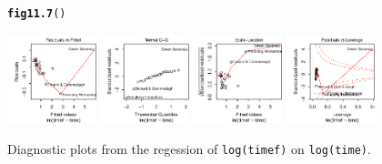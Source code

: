 \documentclass[12pt, a4paper,  BCOR=8.25mm, DIV=15]{scrartcl}\usepackage[]{graphicx}\usepackage[]{color}
\makeatletter
\newcommand{\hlstd}[1]{\textcolor[rgb]{0.345,0.345,0.345}{#1}}%
\newcommand{\hlkwd}[1]{\textcolor[rgb]{0.737,0.353,0.396}{\textbf{#1}}}%
\newenvironment{kframe}{%
 \def\at@end@of@kframe{}%
 \ifinner\ifhmode%
  \def\at@end@of@kframe{\end{minipage}}%
  \begin{minipage}{\columnwidth}%
 \fi\fi%
 \def\FrameCommand##1{\hskip\@totalleftmargin \hskip-\fboxsep
 \colorbox{shadecolor}{##1}\hskip-\fboxsep
     \hskip-\linewidth \hskip-\@totalleftmargin \hskip\columnwidth}%
 \MakeFramed {\advance\hsize-\width
   \@totalleftmargin\z@ \linewidth\hsize
   \@setminipage}}%
 {\par\unskip\endMakeFramed%
 \at@end@of@kframe}
\newenvironment{knitrout}{}{} %
\newcommand{\txtt}[1]{{\texttt{#1}}}
\makeatother
\begin{document}
\begin{figure}[H]
\begin{knitrout}
\color{fgcolor}\begin{kframe}
\begin{alltt}
\hlkwd{fig11.7}\hlstd{()}
\end{alltt}
\end{kframe}

{\centering \includegraphics[width=0.23\textwidth]{figs/reg-diag-mf-11_7-1} 
\includegraphics[width=0.23\textwidth]{figs/reg-diag-mf-11_7-2} 
\includegraphics[width=0.23\textwidth]{figs/reg-diag-mf-11_7-3} 
\includegraphics[width=0.23\textwidth]{figs/reg-diag-mf-11_7-4} 

}



\end{knitrout}
\caption{Diagnostic plots from the regession of \txtt{log(timef)} on
  \txtt{log(time)}.}\label{fig:diag-mftime}
\end{figure}
\end{document}
